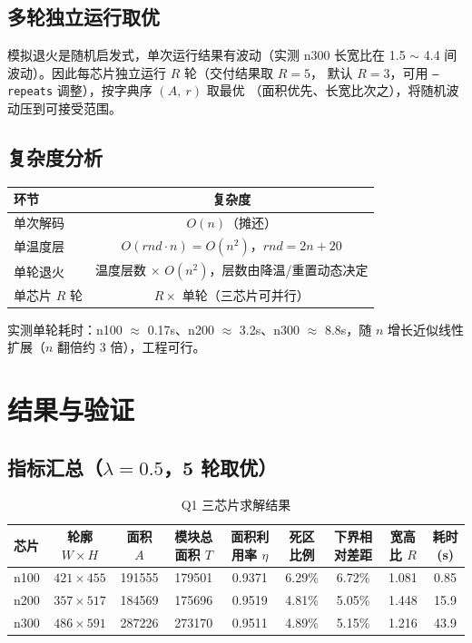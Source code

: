 \documentclass[12pt,a4paper]{article}
\begin{document}
\subsection{多轮独立运行取优}

模拟退火是随机启发式，单次运行结果有波动（实测 n300 长宽比在
1.5 $\sim$ 4.4 间波动）。因此每芯片独立运行 $R$ 轮（交付结果取 $R=5$，
默认 $R=3$，可用 \texttt{--repeats} 调整），按字典序 $(A,\ r)$ 取最优
（面积优先、长宽比次之），将随机波动压到可接受范围。

\subsection{复杂度分析}

\begin{table}[H]
\centering
\small
\begin{tabular}{lc}
\toprule
环节 & 复杂度 \\
\midrule
单次解码 & $O(n)$（摊还） \\
单温度层 & $O(rnd \cdot n) = O(n^2)$，$rnd = 2n+20$ \\
单轮退火 & 温度层数 $\times$ $O(n^2)$，层数由降温/重置动态决定 \\
单芯片 $R$ 轮 & $R \times$ 单轮（三芯片可并行） \\
\bottomrule
\end{tabular}
\end{table}

实测单轮耗时：n100 $\approx$ 0.17s、n200 $\approx$ 3.2s、n300
$\approx$ 8.8s，随 $n$ 增长近似线性扩展（$n$ 翻倍约 3 倍），工程可行。

\section{结果与验证}

\subsection{指标汇总（$\lambda = 0.5$，5 轮取优）}


\begin{table}[H]
\centering
\caption{Q1 三芯片求解结果}
\small
\begin{tabular}{lcccccccc}
\toprule
芯片 & 轮廓 $W \times H$ & 面积 $A$ & 模块总面积 $T$ & 面积利用率 $\eta$ & 死区比例 & 下界相对差距 & 宽高比 $R$ & 耗时(s) \\
\midrule
n100 & $421\times455$ & 191555 & 179501 & 0.9371 & 6.29\% & 6.72\% & 1.081 & 0.85 \\
n200 & $357\times517$ & 184569 & 175696 & 0.9519 & 4.81\% & 5.05\% & 1.448 & 15.9 \\
n300 & $486\times591$ & 287226 & 273170 & 0.9511 & 4.89\% & 5.15\% & 1.216 & 43.9 \\
\bottomrule
\end{tabular}
\end{table}
\end{document}

